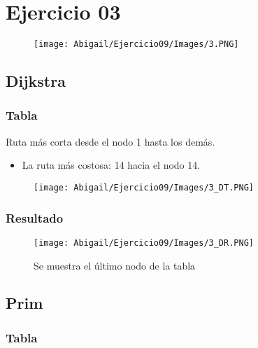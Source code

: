 \documentclass[12pt]{article}
\begin{document}
  
  \section{Ejercicio 03}
    \begin{figure}[h!]
      \centering
      \texttt{[image: Abigail/Ejercicio09/Images/3.PNG]}
    \end{figure} 

    \subsection{Dijkstra}

      \subsubsection{Tabla}
        Ruta más corta desde el nodo 1 hasta los demás.

        \begin{itemize}
          \item La ruta más costosa: 14 hacia el nodo 14.
        \end{itemize}
        
        \begin{figure}[h!]
          \centering
          \texttt{[image: Abigail/Ejercicio09/Images/3\_DT.PNG]}
          
        \end{figure} 

      \subsubsection{Resultado}
        \begin{figure}[h!]
          \centering
          \texttt{[image: Abigail/Ejercicio09/Images/3\_DR.PNG]}
          \caption{Se muestra el último nodo de la tabla}
        \end{figure} 


    \subsection{Prim}

      \subsubsection{Tabla}
\end{document}

